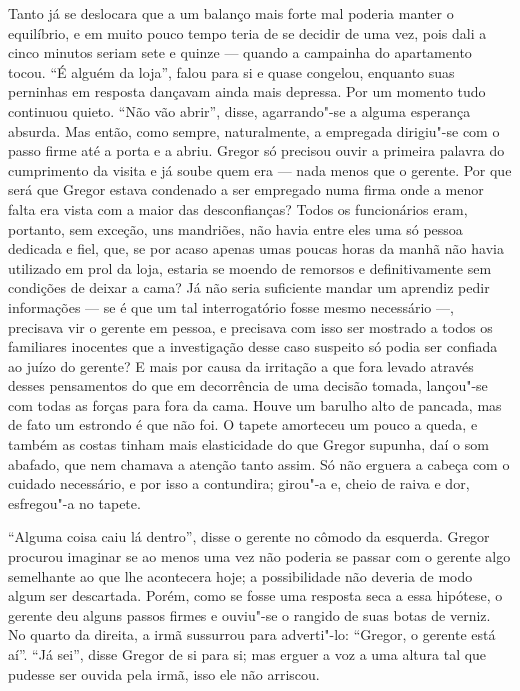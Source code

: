 Tanto já se deslocara que a um balanço mais forte mal poderia
manter o equilíbrio, e em muito pouco tempo teria de se decidir de uma
vez, pois dali a cinco minutos seriam sete e quinze --- quando a campainha
do apartamento tocou. “É alguém da loja”, falou para si e quase congelou,
enquanto suas perninhas em resposta dançavam ainda mais depressa. Por um
momento tudo continuou quieto. “Não vão abrir”, disse, agarrando"-se a
alguma esperança absurda. Mas então, como sempre, naturalmente, a
empregada dirigiu"-se com o passo firme até a porta e a abriu. Gregor só
precisou ouvir a primeira palavra do cumprimento da visita e já soube quem
era --- nada menos que o gerente. Por que será que Gregor estava condenado a
ser empregado numa firma onde a menor falta era vista com a maior das
desconfianças? Todos os funcionários eram, portanto, sem exceção, uns
mandriões, não havia entre eles uma só pessoa dedicada e fiel, que, se por
acaso apenas umas poucas horas da manhã não havia utilizado em prol da
loja, estaria se moendo de remorsos e definitivamente sem condições de
deixar a cama? Já não seria suficiente mandar um aprendiz pedir
informações --- se é que um tal interrogatório fosse mesmo necessário ---,
precisava vir o gerente em pessoa, e precisava com isso ser mostrado a
todos os familiares inocentes que a investigação desse caso suspeito só
podia ser confiada ao juízo do gerente? E mais por causa da irritação a
que fora levado através desses pensamentos do que em decorrência de uma
decisão tomada, lançou"-se com todas as forças para fora da cama. Houve um
barulho alto de pancada, mas de fato um estrondo é que não foi. O tapete
amorteceu um pouco a queda, e também as costas tinham mais elasticidade do
que Gregor supunha, daí o som abafado, que nem chamava a atenção tanto
assim. Só não erguera a cabeça com o cuidado necessário, e por isso a
contundira; girou"-a e, cheio de raiva e dor, esfregou"-a no tapete.

“Alguma coisa caiu lá dentro”, disse o gerente no cômodo da esquerda.
Gregor procurou imaginar se ao menos uma vez não poderia se passar com o
gerente algo semelhante ao que lhe acontecera hoje; a possibilidade não
deveria de modo algum ser descartada. Porém, como se fosse uma resposta
seca a essa hipótese, o gerente deu alguns passos firmes e ouviu"-se o
rangido de suas botas de verniz. No quarto da direita, a irmã sussurrou
para adverti"-lo: “Gregor, o gerente está aí”. “Já sei”, disse Gregor de si
para si; mas erguer a voz a uma altura tal que pudesse ser ouvida pela
irmã, isso ele não arriscou.

